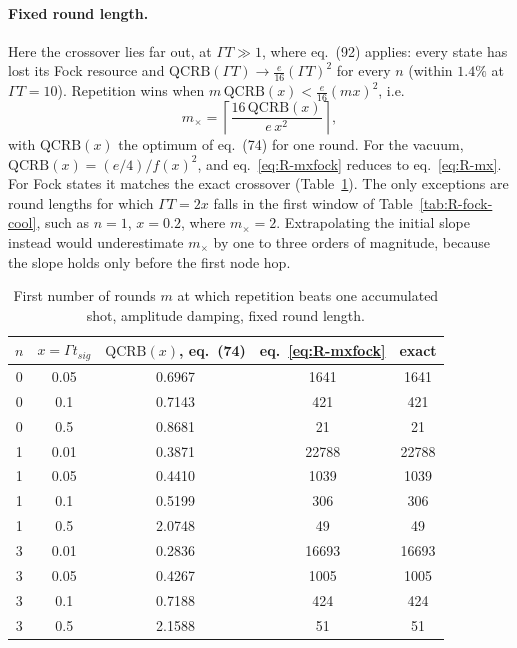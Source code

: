 \paragraph{Fixed round length.} Here the crossover lies far out, at $\Gamma T \gg 1$, where eq.~(92) applies: every state has lost its Fock resource and $\mathrm{QCRB}(\Gamma T) \to \tfrac{e}{16}(\Gamma T)^2$ for every $n$ (within $1.4\%$ at $\Gamma T = 10$). Repetition wins when $m\,\mathrm{QCRB}(x) < \tfrac{e}{16}(mx)^2$, i.e.
\begin{equation}
\label{eq:R-mxfock}
    m_\times = \left\lceil \frac{16\,\mathrm{QCRB}(x)}{e\,x^2} \right\rceil ,
\end{equation}
with $\mathrm{QCRB}(x)$ the optimum of eq.~(74) for one round. For the vacuum, $\mathrm{QCRB}(x) = (e/4)/f(x)^2$, and eq.~\eqref{eq:R-mxfock} reduces to eq.~\eqref{eq:R-mx}. For Fock states it matches the exact crossover (Table~\ref{tab:R-mx}). The only exceptions are round lengths for which $\Gamma T = 2x$ falls in the first window of Table~\ref{tab:R-fock-cool}, such as $n = 1$, $x = 0.2$, where $m_\times = 2$. Extrapolating the initial slope instead would underestimate $m_\times$ by one to three orders of magnitude, because the slope holds only before the first node hop.

\begin{table}[h]
\centering
\begin{tabular}{c c c c c}
\hline
$n$ & $x = \Gamma t_{sig}$ & $\mathrm{QCRB}(x)$, eq.~(74) & eq.~\eqref{eq:R-mxfock} & exact \\
\hline
0 & 0.05 & 0.6967 & 1641 & 1641 \\
0 & 0.1 & 0.7143 & 421 & 421 \\
0 & 0.5 & 0.8681 & 21 & 21 \\
1 & 0.01 & 0.3871 & 22788 & 22788 \\
1 & 0.05 & 0.4410 & 1039 & 1039 \\
1 & 0.1 & 0.5199 & 306 & 306 \\
1 & 0.5 & 2.0748 & 49 & 49 \\
3 & 0.01 & 0.2836 & 16693 & 16693 \\
3 & 0.05 & 0.4267 & 1005 & 1005 \\
3 & 0.1 & 0.7188 & 424 & 424 \\
3 & 0.5 & 2.1588 & 51 & 51 \\
\hline
\end{tabular}
\caption{First number of rounds $m$ at which repetition beats one accumulated shot, amplitude damping, fixed round length.}
\label{tab:R-mx}
\end{table}

